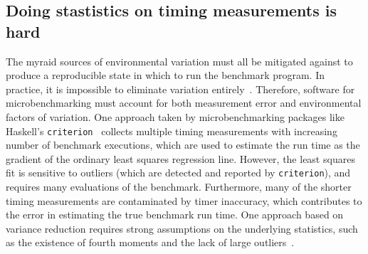 \documentclass[conference]{IEEEtran}
\begin{document}


\subsection{Doing stastistics on timing measurements is hard}

The myraid sources of environmental variation must all be mitigated against to
produce a reproducible state in which to run the benchmark program. In practice,
it is impossible to eliminate variation entirely~\cite{Alcocer2015,Barrett2016}.
Therefore, software for microbenchmarking must account for both measurement error
and environmental factors of variation.
One approach taken by microbenchmarking packages like Haskell's
\lstinline|criterion|~\cite{criterion} collects multiple timing measurements
with increasing number of benchmark executions, which are used to estimate the
run time as the gradient of the ordinary least squares regression line.
However, the least squares fit is sensitive to outliers (which are detected and
reported by \lstinline|criterion|), and requires many evaluations of the benchmark.
Furthermore, many of the shorter timing measurements are contaminated by timer
inaccuracy, which contributes to the error in estimating the true benchmark run time.
One approach based on variance reduction requires strong assumptions on the
underlying statistics, such as the existence of fourth moments and the lack of
large outliers~\cite{Kalibera2006,Kalibera2013}.
\end{document}
